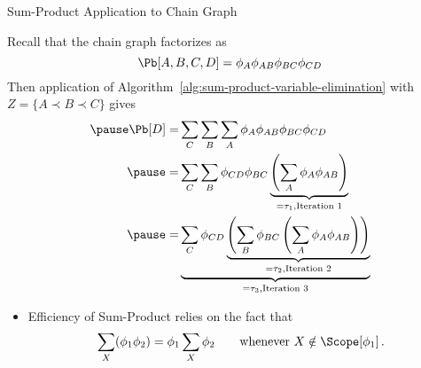 \begin{frame}{Sum-Product Application to Chain Graph}
    \begin{example}
        Recall that the chain graph factorizes as
    \begin{equation}
    \Pb[A,B,C,D] = \phi_A \phi_{AB} \phi_{BC} \phi_{CD}
    \end{equation}
    \pause 
    Then application of Algorithm~\ref{alg:sum-product-variable-elimination} with $Z = \{A \prec B \prec C\}$ gives
    \begin{equation}
        \begin{aligned}
        \pause \Pb[D] = & \sum_{C} \sum_{B} \sum_{A} \phi_A \phi_{AB} \phi_{BC} \phi_{CD} \\
        \pause = & \sum_C \sum_B \phi_{CD} \phi_{BC} \underbrace{\left( \sum_A \phi_A \phi_{AB}\right)}_{= \tau_1, \text{Iteration } 1} \\
        \pause = & \underbrace{\sum_C \phi_{CD} \underbrace{\left(\sum_B \phi_{BC} \left( \sum_A \phi_A \phi_{AB}\right)\right)}_{= \tau_2, \text{Iteration } 2}}_{= \tau_3, \text{Iteration } 3} \\
        \end{aligned}
    \end{equation}
    \end{example}

    \pause
    \begin{itemize}
    \item Efficiency of Sum-Product relies on the fact that
    \begin{equation}
        \sum_X (\phi_1 \phi_2) = \phi_1 \sum_X \phi_2 \quad\quad \text{whenever } X \notin \Scope[\phi_1]\,.
    \end{equation}
    \end{itemize}
\end{frame}

